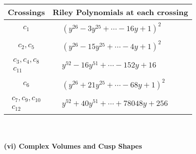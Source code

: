 \documentclass[1p]{elsarticle_modified}
\theoremstyle{definition}
\begin{document}
\begin{tabular}{m{50pt}|m{274pt}}
Crossings & \hspace{64pt}Riley Polynomials at each crossing \\
\hline $$\begin{aligned}c_{1}\end{aligned}$$&$\begin{aligned}
&(y^{26}-3 y^{25}+\cdots-16 y+1)^{2}
\end{aligned}$\\
\hline $$\begin{aligned}c_{2},c_{5}\end{aligned}$$&$\begin{aligned}
&(y^{26}-15 y^{25}+\cdots-4 y+1)^{2}
\end{aligned}$\\
\hline $$\begin{aligned}c_{3},c_{4},c_{8}\\c_{11}\end{aligned}$$&$\begin{aligned}
&y^{52}-16 y^{51}+\cdots-152 y+16
\end{aligned}$\\
\hline $$\begin{aligned}c_{6}\end{aligned}$$&$\begin{aligned}
&(y^{26}+21 y^{25}+\cdots-68 y+1)^{2}
\end{aligned}$\\
\hline $$\begin{aligned}c_{7},c_{9},c_{10}\\c_{12}\end{aligned}$$&$\begin{aligned}
&y^{52}+40 y^{51}+\cdots+78048 y+256
\end{aligned}$\\
\hline
\end{tabular}\\~\\
\newpage\flushleft \textbf{(vi) Complex Volumes and Cusp Shapes}
\end{document}
